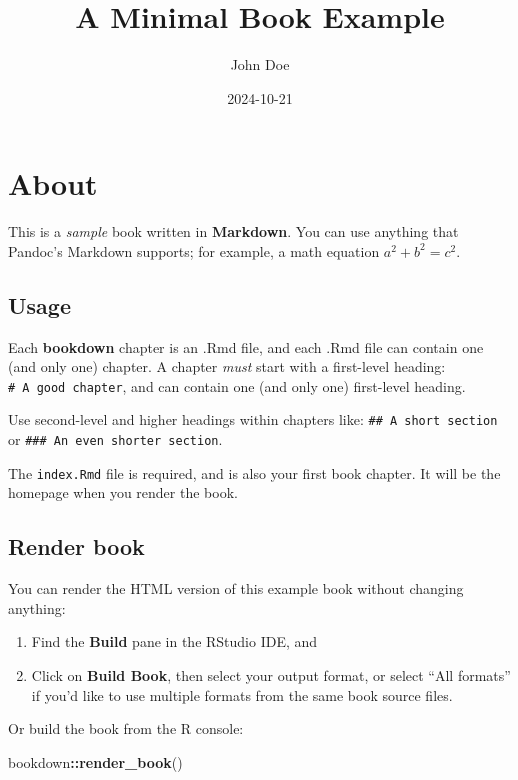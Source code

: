 \documentclass[
]{book}
\title{A Minimal Book Example}
\author{John Doe}
\date{2024-10-21}
\newenvironment{Shaded}{\begin{snugshade}}{\end{snugshade}}
\newcommand{\FunctionTok}[1]{\textcolor[rgb]{0.13,0.29,0.53}{\textbf{#1}}}
\newcommand{\NormalTok}[1]{#1}
\newcommand{\SpecialCharTok}[1]{\textcolor[rgb]{0.81,0.36,0.00}{\textbf{#1}}}
\begin{document}
\maketitle

{
\setcounter{tocdepth}{1}
\tableofcontents
}
\chapter{About}\label{about}

This is a \emph{sample} book written in \textbf{Markdown}. You can use anything that Pandoc's Markdown supports; for example, a math equation \(a^2 + b^2 = c^2\).

\section{Usage}\label{usage}

Each \textbf{bookdown} chapter is an .Rmd file, and each .Rmd file can contain one (and only one) chapter. A chapter \emph{must} start with a first-level heading: \texttt{\#\ A\ good\ chapter}, and can contain one (and only one) first-level heading.

Use second-level and higher headings within chapters like: \texttt{\#\#\ A\ short\ section} or \texttt{\#\#\#\ An\ even\ shorter\ section}.

The \texttt{index.Rmd} file is required, and is also your first book chapter. It will be the homepage when you render the book.

\section{Render book}\label{render-book}

You can render the HTML version of this example book without changing anything:

\begin{enumerate}
\def\labelenumi{\arabic{enumi}.}
\item
  Find the \textbf{Build} pane in the RStudio IDE, and
\item
  Click on \textbf{Build Book}, then select your output format, or select ``All formats'' if you'd like to use multiple formats from the same book source files.
\end{enumerate}

Or build the book from the R console:

\begin{Shaded}
\begin{Highlighting}[]
\NormalTok{bookdown}\SpecialCharTok{::}\FunctionTok{render\_book}\NormalTok{()}
\end{Highlighting}
\end{Shaded}
\end{document}
